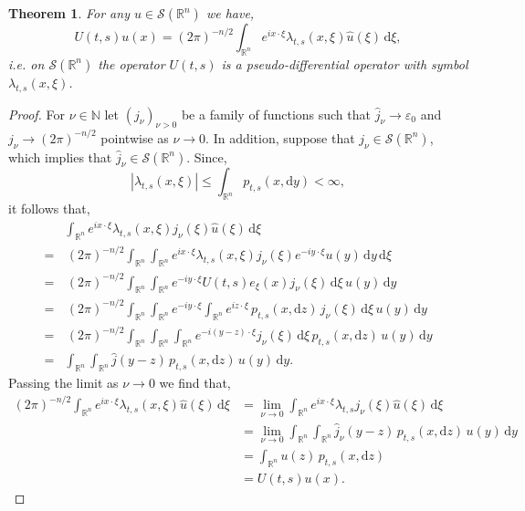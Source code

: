\documentclass[a4paper, 12pt]{report}
\newtheorem{theorem}{Theorem}[section]
\theoremstyle{remark}
\theoremstyle{definition}
\begin{document}
\begin{theorem}
For any $u \in \mathcal{S}(\mathbb{R}^n)$ we have,
\begin{equation}
U(t, s)u(x) = (2\pi)^{-n/2}\int_{\mathbb{R}^n}e^{ix\cdot\xi}\lambda_{t, s}(x, \xi)\hat{u}(\xi)\,\mathrm{d}\xi,
\end{equation}
i.e. on $\mathcal{S}(\mathbb{R}^n)$ the operator $U(t, s)$ is a pseudo-differential operator with symbol $\lambda_{t, s}(x, \xi)$.
\end{theorem}
\begin{proof}
For $\nu \in \mathbb{N}$ let $(j_\nu)_{\nu > 0}$ be a family of functions such that $\hat{j}_\nu \to \varepsilon_0$ and $j_\nu \to (2\pi)^{-n/2}$ pointwise as $\nu \to 0$.  In addition, suppose that $j_\nu \in \mathcal{S}(\mathbb{R}^n)$, which implies that $\hat{j}_\nu \in \mathcal{S}(\mathbb{R}^n)$.  Since,
$$
|\lambda_{t, s}(x, \xi)| \le \int_{\mathbb{R}^n}p_{t, s}(x, \mathrm{d}y) < \infty,
$$
it follows that,
$$
\begin{aligned}
& \int_{\mathbb{R}^n}e^{ix\cdot\xi}\lambda_{t, s}(x, \xi)j_\nu(\xi)\hat{u}(\xi)\,\mathrm{d}\xi\\
= & \, (2\pi)^{-n/2}\int_{\mathbb{R}^n}\int_{\mathbb{R}^n}e^{ix\cdot\xi}\lambda_{t, s}(x, \xi)j_\nu(\xi)e^{-iy\cdot\xi}u(y)\,\mathrm{d}y\,\mathrm{d}\xi\\
= & \, (2\pi)^{-n/2}\int_{\mathbb{R}^n}\int_{\mathbb{R}^n}e^{-iy\cdot\xi}U(t, s)e_\xi(x)j_\nu(\xi)\,\mathrm{d}\xi\,u(y)\,\mathrm{d}y\\
= & \, (2\pi)^{-n/2}\int_{\mathbb{R}^n}\int_{\mathbb{R}^n}e^{-iy\cdot\xi}\int_{\mathbb{R}^n}e^{iz\cdot\xi}\,p_{t, s}(x, \mathrm{d}z)\,j_\nu(\xi)\,\mathrm{d}\xi\,u(y)\,\mathrm{d}y\\
= & \, (2\pi)^{-n/2}\int_{\mathbb{R}^n}\int_{\mathbb{R}^n}\int_{\mathbb{R}^n}e^{-i(y - z)\cdot\xi}j_\nu(\xi)\,\mathrm{d}\xi\,p_{t, s}(x, \mathrm{d}z)\,u(y)\,\mathrm{d}y\\
= & \int_{\mathbb{R}^n}\int_{\mathbb{R}^n}\hat{j}(y - z)\,p_{t, s}(x, \mathrm{d}z)\,u(y)\,\mathrm{d}y.
\end{aligned}
$$
Passing the limit as $\nu \to 0$ we find that,
$$
\begin{aligned}
(2\pi)^{-n/2}\int_{\mathbb{R}^n}e^{ix\cdot\xi}\lambda_{t, s}(x, \xi)\hat{u}(\xi)\,\mathrm{d}\xi & = \lim_{\nu \to 0}\int_{\mathbb{R}^n}e^{ix\cdot\xi}\lambda_{t, s}j_\nu(\xi)\hat{u}(\xi)\,\mathrm{d}\xi\\
& = \lim_{\nu \to 0}\int_{\mathbb{R}^n}\int_{\mathbb{R}^n}\hat{j}_\nu(y - z)\,p_{t, s}(x, \mathrm{d}z)\,u(y)\,\mathrm{d}y\\
& = \int_{\mathbb{R}^n}u(z)\,p_{t, s}(x, \mathrm{d}z)\\
& = U(t, s)u(x).
\end{aligned}
$$
\end{proof}
\end{document}
